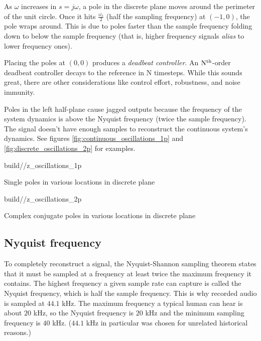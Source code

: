 As $\omega$ increases in $s = j\omega$, a pole in the discrete plane moves
around the perimeter of the unit circle. Once it hits $\frac{\omega_s}{2}$ (half
the sampling frequency) at $(-1, 0)$, the pole wraps around. This is due to
poles faster than the sample frequency folding down to below the sample
frequency (that is, higher frequency signals \textit{alias} to lower frequency
ones).

Placing the poles at $(0, 0)$ produces a \textit{deadbeat controller}. An
$\rm N^{th}$-order deadbeat controller decays to the \gls{reference} in N
timesteps. While this sounds great, there are other considerations like
\gls{control effort}, \gls{robustness}, and \gls{noise immunity}.

Poles in the left half-plane cause jagged outputs because the frequency of the
\gls{system} dynamics is above the Nyquist frequency (twice the sample
frequency). The  signal doesn't have enough
samples to reconstruct the continuous \gls{system}'s dynamics. See figures
\ref{fig:continuous_oscillations_1p} and \ref{fig:discrete_oscillations_2p} for
examples.
\begin{bookfigure}
  \begin{minisvg}{2}{build/\chapterpath/z_oscillations_1p}
    \caption{Single poles in various locations in discrete plane}
    \label{fig:continuous_oscillations_1p}
  \end{minisvg}
  \hfill
  \begin{minisvg}{2}{build/\chapterpath/z_oscillations_2p}
    \caption{Complex conjugate poles in various locations in discrete plane}
    \label{fig:discrete_oscillations_2p}
  \end{minisvg}
\end{bookfigure}

\subsection{Nyquist frequency}

To completely reconstruct a signal, the Nyquist-Shannon sampling theorem states
that it must be sampled at a frequency at least twice the maximum frequency it
contains. The highest frequency a given sample rate can capture is called the
Nyquist frequency, which is half the sample frequency. This is why recorded
audio is sampled at $44.1$ kHz. The maximum frequency a typical human can hear
is about $20$ kHz, so the Nyquist frequency is $20$ kHz and the minimum sampling
frequency is $40$ kHz. ($44.1$ kHz in particular was chosen for unrelated
historical reasons.)

